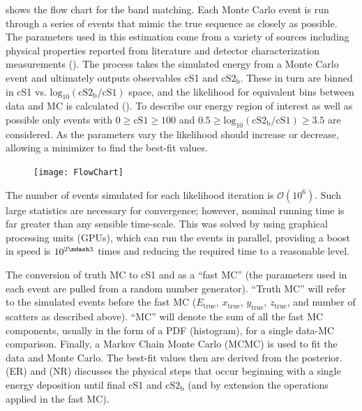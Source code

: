  shows the flow chart for the band matching.  Each Monte Carlo event is run
through a series of events that mimic the true sequence as closely as possible.  The parameters used in this estimation come from
a variety of sources including physical properties reported from literature and detector characterization measurements
().  The process takes the simulated energy from a Monte Carlo event and ultimately outputs observables cS1 and
$\mathrm{cS2_b}$.  These in turn are binned in cS1 vs. $\mathrm{log_{10}(cS2_b / cS1)}$ space, and the likelihood for equivalent bins
between data and MC is calculated ().  To describe our energy region of
interest as well as possible only events with $0 \geq \mathrm{cS1} \geq 100$ and $0.5 \geq \mathrm{log_{10}(cS2_b / cS1)} \geq 3.5$ are
considered.  As the parameters vary the likelihood should increase or decrease, allowing a minimizer to find the best-fit values.

\begin{figure}
\centering
\texttt{[image: FlowChart]}
\label{fig:er_nr_calibrations_parameter_determ_flow_chart}
\end{figure}

The number of events simulated for each likelihood iteration is $\mathcal{O}(10^6)$.  Such large statistics are necessary for convergence;
however, nominal running time is far greater than any sensible time-scale.  This was solved by using graphical processing units (GPUs),
which can run the events in parallel, providing a boost in speed is $10^{2 \mdash 3}$ times and reducing the required time to a
reasonable level.

The conversion of truth MC to cS1 and \cstwob as a ``fast MC'' (the parameters used in each event are pulled
from a random number generator).  ``Truth MC'' will refer to the simulated events before the fast MC ($E_{\mathrm{true}}$,
$x_{\mathrm{true}}$, $y_{\mathrm{true}}$, $z_{\mathrm{true}}$, and number
of scatters as described above).  ``MC'' will denote the sum of all the fast MC components, usually in the form of a PDF (histogram), for
a single data-MC comparison.  Finally, a Markov Chain Monte Carlo (MCMC) is used to fit the data and Monte Carlo.  The best-fit values
then are derived from the posterior.   (ER) and
 (NR) discusses the physical steps that occur beginning with a single energy
deposition until final cS1 and $\mathrm{cS2_b}$ (and by extension the operations applied in the fast MC).

